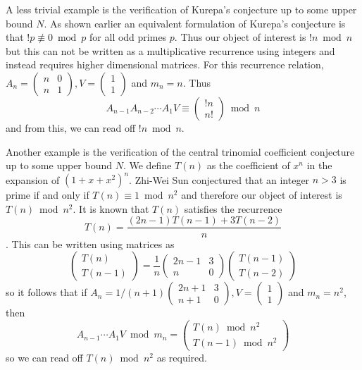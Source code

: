 A less trivial example is the verification of Kurepa's conjecture up to some upper bound $N$. As shown earlier  an equivalent formulation of Kurepa's conjecture is that $!p\not \equiv 0 \bmod p$ for all odd primes $p$. Thus our object of interest is $!n\bmod n$ but this can not be written as a multiplicative recurrence using integers and instead requires higher dimensional matrices. For this recurrence relation, $A_n=\begin{pmatrix} n & 0 \\ n & 1 \end{pmatrix}, V=\begin{pmatrix} 1 \\1 \end{pmatrix}$ and $ m_n=n$. Thus \[A_{n-1}A_{n-2}\cdots A_{1} V\equiv \begin{pmatrix} !n \\n! \end{pmatrix} \bmod n\] and from this, we can read off $!n\bmod n$.

Another example is the verification of the central trinomial coefficient conjecture up to some upper bound $N$. We define $T(n)$ as the coefficient of $x^n$ in the expansion of $(1+x+x^2)^n$. Zhi-Wei Sun conjectured that an integer $n>3$ is prime if and only if $T(n)\equiv 1 \bmod n^2$ and therefore our object of interest is $T(n)\bmod n^2$.  It is known that $T(n)$ satisfies the recurrence \[T(n)=\frac{(2n-1)T(n-1)+3T(n-2)}{n}\] . This can be written using matrices as \[\begin{pmatrix} T(n) \\ T(n-1) \end{pmatrix}=\frac{1}{n}\begin{pmatrix} 2n-1 & 3 \\n & 0 \end{pmatrix}  \begin{pmatrix} T(n-1) \\T(n-2) \end{pmatrix}\] so it follows that if $A_n=1/(n+1) \begin{pmatrix} 2n+1 & 3 \\n+1 & 0 \end{pmatrix}, V=\begin{pmatrix} 1 \\1 \end{pmatrix}$ and $ m_n=n^2$, then \[A_{n-1}\cdots A_1 V\bmod m_n=\begin{pmatrix} T(n)\bmod n^2 \\ T(n-1) \bmod n^2 \end{pmatrix}\] so we can read off $T(n)\bmod n^2$ as required. 

